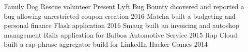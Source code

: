 \begin{cvhonors}
  \cvhonor
    {Family Dog Rescue}
    {volunteer}
    {}
    {Present}
  \cvhonor
    {Lyft Bug Bounty}
    {dicovered and reported a bug allowing unrestricted coupon creation}
    {}
    {2016}
  \cvhonor
    {Matcha}
    {built a budgeting and personal finance Flask application}
    {}
    {2016}
  \cvhonor
    {Smaug}
    {built an invoicing and autoshop management Rails application for Balboa Automotive Service}
    {}
    {2015}
  \cvhonor
    {Rap Cloud}
    {built a rap phrase aggregator build for LinkedIn Hacker Games}
    {}
    {2014}
\end{cvhonors}
